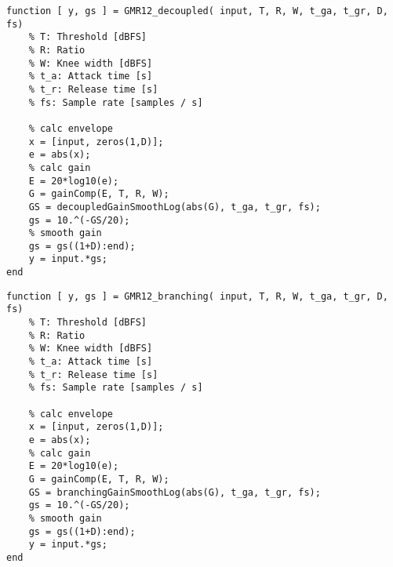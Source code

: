 \documentclass[../main2.tex]{subfiles}
\begin{document}
\begin{lstlisting}[style=customc]
function [ y, gs ] = GMR12_decoupled( input, T, R, W, t_ga, t_gr, D, fs)
    % T: Threshold [dBFS]
    % R: Ratio
    % W: Knee width [dBFS]
    % t_a: Attack time [s]
    % t_r: Release time [s]
    % fs: Sample rate [samples / s]
    
    % calc envelope
    x = [input, zeros(1,D)];
    e = abs(x);
    % calc gain
    E = 20*log10(e);
    G = gainComp(E, T, R, W);
    GS = decoupledGainSmoothLog(abs(G), t_ga, t_gr, fs);
    gs = 10.^(-GS/20);
    % smooth gain
    gs = gs((1+D):end);
    y = input.*gs;
end
\end{lstlisting}
\begin{lstlisting}[style=customc]
function [ y, gs ] = GMR12_branching( input, T, R, W, t_ga, t_gr, D, fs)
    % T: Threshold [dBFS]
    % R: Ratio
    % W: Knee width [dBFS]
    % t_a: Attack time [s]
    % t_r: Release time [s]
    % fs: Sample rate [samples / s]
    
    % calc envelope
    x = [input, zeros(1,D)];
    e = abs(x);
    % calc gain
    E = 20*log10(e);
    G = gainComp(E, T, R, W);
    GS = branchingGainSmoothLog(abs(G), t_ga, t_gr, fs);
    gs = 10.^(-GS/20);
    % smooth gain
    gs = gs((1+D):end);
    y = input.*gs;
end
\end{lstlisting}
\end{document}
